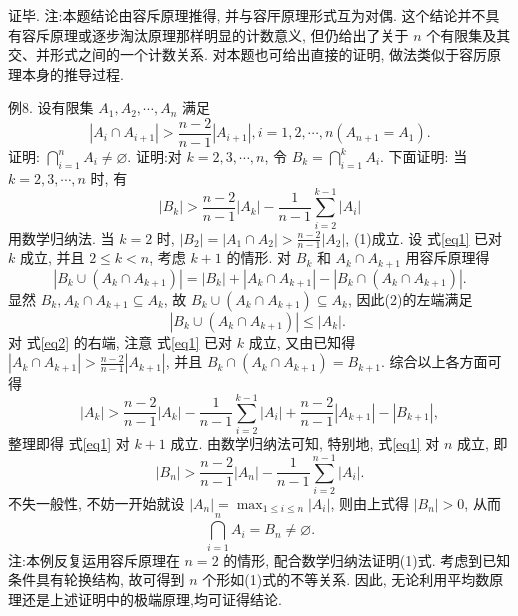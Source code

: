 证毕.
注:本题结论由容斥原理推得, 并与容厈原理形式互为对偶.
这个结论并不具有容斥原理或逐步淘汰原理那样明显的计数意义, 但仍给出了关于 $n$ 个有限集及其交、并形式之间的一个计数关系.
对本题也可给出直接的证明, 做法类似于容厉原理本身的推导过程.



例8. 设有限集 $A_1, A_2, \cdots, A_n$ 满足
$$
\left|A_i \cap A_{i+1}\right|>\frac{n-2}{n-1}\left|A_{i+1}\right|, i=1,2, \cdots, n\left(A_{n+1}=A_1\right) .
$$
证明: $\bigcap_{i=1}^n A_i \neq \varnothing$. 
证明:对 $k=2,3, \cdots, n$, 令 $B_k=\bigcap_{i=1}^k A_i$. 下面证明: 当 $k=2,3, \cdots, n$ 时, 有
$$
\left|B_k\right|>\frac{n-2}{n-1}\left|A_k\right|-\frac{1}{n-1} \sum_{i=2}^{k-1}\left|A_i\right| \label{eq1}
$$
用数学归纳法.
当 $k=2$ 时, $\left|B_2\right|=\left|A_1 \cap A_2\right|>\frac{n-2}{n-1}\left|A_2\right|$, (1)成立.
设 式\ref{eq1} 已对 $k$ 成立, 并且 $2 \leqslant k<n$, 考虑 $k+1$ 的情形.
对 $B_k$ 和 $A_k \cap A_{k+1}$ 用容斥原理得
$$
\left|B_k \cup\left(A_k \cap A_{k+1}\right)\right|=\left|B_k\right|+\left|A_k \cap A_{k+1}\right|-\left|B_k \cap\left(A_k \cap A_{k+1}\right)\right| . \label{eq2}
$$
显然 $B_k, A_k \cap A_{k+1} \subseteq A_k$, 故 $B_k \cup\left(A_k \cap A_{k+1}\right) \subseteq A_k$, 因此(2)的左端满足
$$
\left|B_k \cup\left(A_k \cap A_{k+1}\right)\right| \leqslant\left|A_k\right| \text {. }
$$
对 式\ref{eq2} 的右端, 注意 式\ref{eq1} 已对 $k$ 成立, 又由已知得 $\left|A_k \cap A_{k+1}\right|>\frac{n-2}{n-1}\left|A_{k+1}\right|$, 并且 $B_k \cap\left(A_k \cap A_{k+1}\right)=B_{k+1}$.
综合以上各方面可得
$$
\left|A_k\right|>\frac{n-2}{n-1}\left|A_k\right|-\frac{1}{n-1} \sum_{i=2}^{k-1}\left|A_i\right|+\frac{n-2}{n-1}\left|A_{k+1}\right|-\left|B_{k+1}\right|,
$$
整理即得 式\ref{eq1} 对 $k+1$ 成立.
由数学归纳法可知, 特别地, 式\ref{eq1} 对 $n$ 成立, 即
$$
\left|B_n\right|>\frac{n-2}{n-1}\left|A_n\right|-\frac{1}{n-1} \sum_{i=2}^{n-1}\left|A_i\right| .
$$
不失一般性, 不妨一开始就设 $\left|A_n\right|=\max _{1 \leqslant i \leqslant n}\left|A_i\right|$, 则由上式得 $\left|B_n\right|>0$, 从而
$$
\bigcap_{i=1}^n A_i=B_n \neq \varnothing .
$$
注:本例反复运用容斥原理在 $n=2$ 的情形, 配合数学归纳法证明(1)式.
考虑到已知条件具有轮换结构, 故可得到 $n$ 个形如(1)式的不等关系.
因此, 无论利用平均数原理还是上述证明中的极端原理,均可证得结论.


